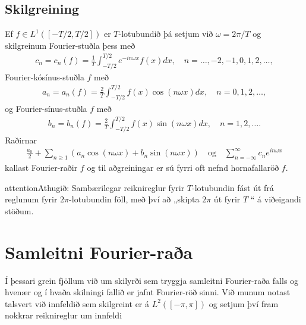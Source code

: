\documentclass[a4paper,10pt,icelandic]{sphinxmanual}
\begin{document}
\subsection{Skilgreining}
\label{\detokenize{Kafli02:id4}}
Ef \(f \in L^1([-T/2,T/2])\) er \(T\)-lotubundið þá setjum við \(\omega = 2\pi/T\) og skilgreinum Fourier-stuðla þess með
\begin{equation*}
\begin{split}c_n = c_n(f) = \frac{1}{T} \int_{-T/2}^{T/2} e^{-in \omega x} f(x) dx, \quad n = \ldots,-2,-1,0,1,2,\ldots,\end{split}
\end{equation*}
Fourier-kósínus-stuðla \(f\) með
\begin{equation*}
\begin{split}a_n = a_n(f) = \frac{2}{T} \int_{-T/2}^{T/2} f(x) \cos(n\omega x) dx, \quad n = 0,1,2,\ldots,\end{split}
\end{equation*}
og Fourier-sínus-stuðla \(f\) með
\begin{equation*}
\begin{split}b_n = b_n(f) = \frac{2}{T} \int_{-T/2}^{T/2} f(x) \sin(n\omega x) dx, \quad n = 1,2,\ldots.\end{split}
\end{equation*}
Raðirnar
\begin{equation*}
\begin{split}\frac{a_0}{2} + \sum_{n\geq 1} \left(a_n \cos(n\omega x) + b_n \sin(n\omega x)\right) \quad \text{og} \quad \sum_{n=-\infty}^\infty c_n e^{in\omega x}\end{split}
\end{equation*}
kallast Fourier-raðir \(f\) og til aðgreiningar er sú fyrri oft nefnd hornafallaröð \(f\).

\begin{sphinxadmonition}{attention}{Athugið:}
Sambærilegar reiknireglur fyrir \(T\)-lotubundin fást út frá reglunum fyrir \(2\pi\)-lotubundin föll, með því að „skipta \(2\pi\) út fyrir \(T\) “ á viðeigandi stöðum.
\end{sphinxadmonition}


\section{Samleitni Fourier-raða}
\label{\detokenize{Kafli02:samleitni-fourier-raa}}
Í þessari grein fjöllum við um skilyrði sem tryggja samleitni Fourier-raða falls og hvenær og í hvaða skilningi fallið er jafnt Fourier-röð sinni. Við munum notast talsvert við innfeldið sem skilgreint er á \(L^2([-\pi,\pi])\) og setjum því fram nokkrar reiknireglur um innfeldi
\end{document}
